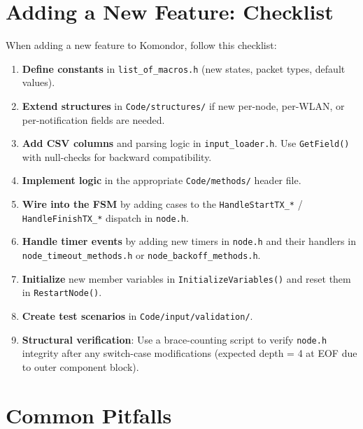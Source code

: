 \documentclass[11pt,a4paper]{article}
\begin{document}
\section{Adding a New Feature: Checklist}
\label{sec:checklist}

When adding a new feature to Komondor, follow this checklist:

\begin{enumerate}
  \item \textbf{Define constants} in \texttt{list\_of\_macros.h} (new states, packet types, default values).
  \item \textbf{Extend structures} in \texttt{Code/structures/} if new per-node, per-WLAN, or per-notification fields are needed.
  \item \textbf{Add CSV columns} and parsing logic in \texttt{input\_loader.h}.  Use \texttt{GetField()} with null-checks for backward compatibility.
  \item \textbf{Implement logic} in the appropriate \texttt{Code/methods/} header file.
  \item \textbf{Wire into the FSM} by adding cases to the \texttt{HandleStartTX\_*} / \texttt{HandleFinishTX\_*} dispatch in \texttt{node.h}.
  \item \textbf{Handle timer events} by adding new timers in \texttt{node.h} and their handlers in \texttt{node\_timeout\_methods.h} or \texttt{node\_backoff\_methods.h}.
  \item \textbf{Initialize} new member variables in \texttt{InitializeVariables()} and reset them in \texttt{RestartNode()}.
  \item \textbf{Create test scenarios} in \texttt{Code/input/validation/}.
  \item \textbf{Structural verification}: Use a brace-counting script to verify \texttt{node.h} integrity after any switch-case modifications (expected depth = 4 at EOF due to outer component block).
\end{enumerate}

\section{Common Pitfalls}
\label{sec:pitfalls}
\end{document}
